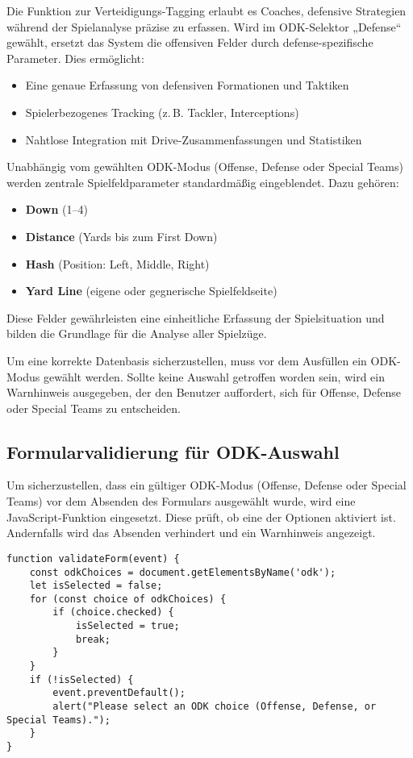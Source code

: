 \documentclass[12pt]{article}
\begin{document}
Die Funktion zur Verteidigungs-Tagging erlaubt es Coaches, defensive Strategien während der Spielanalyse präzise zu erfassen. Wird im ODK-Selektor „Defense“ gewählt, ersetzt das System die offensiven Felder durch defense-spezifische Parameter. Dies ermöglicht:

\begin{itemize}
    \item Eine genaue Erfassung von defensiven Formationen und Taktiken
    \item Spielerbezogenes Tracking (z.\,B. Tackler, Interceptions)
    \item Nahtlose Integration mit Drive-Zusammenfassungen und Statistiken
\end{itemize}

Unabhängig vom gewählten ODK-Modus (Offense, Defense oder Special Teams) werden zentrale Spielfeldparameter standardmäßig eingeblendet. Dazu gehören:

\begin{itemize}
    \item \textbf{Down} (1–4)
    \item \textbf{Distance} (Yards bis zum First Down)
    \item \textbf{Hash} (Position: Left, Middle, Right)
    \item \textbf{Yard Line} (eigene oder gegnerische Spielfeldseite)
\end{itemize}

Diese Felder gewährleisten eine einheitliche Erfassung der Spielsituation und bilden die Grundlage für die Analyse aller Spielzüge.

Um eine korrekte Datenbasis sicherzustellen, muss vor dem Ausfüllen ein ODK-Modus gewählt werden. Sollte keine Auswahl getroffen worden sein, wird ein Warnhinweis ausgegeben, der den Benutzer auffordert, sich für Offense, Defense oder Special Teams zu entscheiden.

\subsection{Formularvalidierung für ODK-Auswahl}

Um sicherzustellen, dass ein gültiger ODK-Modus (Offense, Defense oder Special Teams) vor dem Absenden des Formulars ausgewählt wurde, wird eine JavaScript-Funktion eingesetzt. Diese prüft, ob eine der Optionen aktiviert ist. Andernfalls wird das Absenden verhindert und ein Warnhinweis angezeigt.

\begin{verbatim}
function validateForm(event) {
    const odkChoices = document.getElementsByName('odk');
    let isSelected = false;
    for (const choice of odkChoices) {
        if (choice.checked) {
            isSelected = true;
            break;
        }
    }
    if (!isSelected) {
        event.preventDefault();
        alert("Please select an ODK choice (Offense, Defense, or Special Teams).");
    }
}
\end{verbatim}
\end{document}
